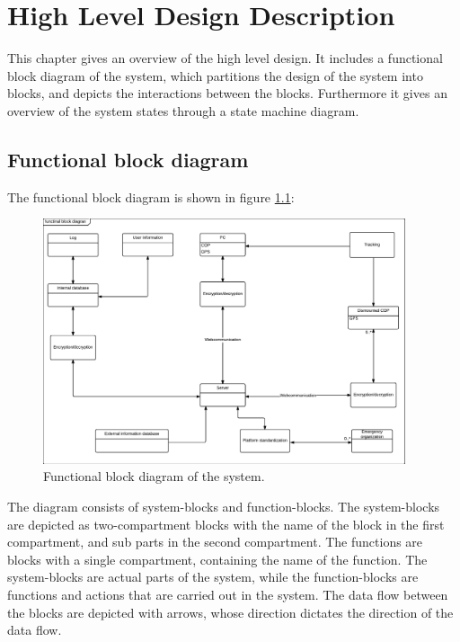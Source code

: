 \chapter{High Level Design Description}
\label{high_level}
This chapter gives an overview of the high level design. It includes a functional block diagram of the system, which partitions the design of the system into blocks, and depicts the interactions between the blocks. Furthermore it gives an overview of the system states through a state machine diagram. 

\section{Functional block diagram}
The functional block diagram is shown in figure \ref{fig:func_block_diagram}:

\begin{figure}[H]
\centering
\includegraphics[width=0.95\textwidth]
{billeder/functional_block_diagram.pdf}
\caption{Functional block diagram of the system.}
\label{fig:func_block_diagram}
\end{figure}

The diagram consists of system-blocks and function-blocks. The system-blocks are depicted as two-compartment blocks with the name of the block in the first compartment, and sub parts in the second compartment. The functions are blocks with a single compartment, containing the name of the function. The system-blocks are actual parts of the system, while the function-blocks are functions and actions that are carried out in the system. The data flow between the blocks are depicted with arrows, whose direction dictates the direction of the data flow. 

